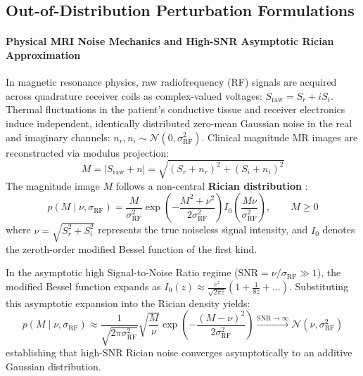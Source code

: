 \documentclass{article}
\begin{document}
\subsection{Out-of-Distribution Perturbation Formulations}

\paragraph{Physical MRI Noise Mechanics and High-SNR Asymptotic Rician Approximation}
In magnetic resonance physics, raw radiofrequency (RF) signals are acquired across quadrature receiver coils as complex-valued voltages: $S_{\text{raw}} = S_r + i S_i$. Thermal fluctuations in the patient's conductive tissue and receiver electronics induce independent, identically distributed zero-mean Gaussian noise in the real and imaginary channels: $n_r, n_i \sim \mathcal{N}(0, \sigma_{\text{RF}}^2)$. Clinical magnitude MR images are reconstructed via modulus projection:
\begin{equation}
    M = |S_{\text{raw}} + n| = \sqrt{(S_r + n_r)^2 + (S_i + n_i)^2}
\end{equation}
The magnitude image $M$ follows a non-central \textbf{Rician distribution} \citep{gudbjartsson1995rician}:
\begin{equation}
    p(M \mid \nu, \sigma_{\text{RF}}) = \frac{M}{\sigma_{\text{RF}}^2} \exp\left( - \frac{M^2 + \nu^2}{2\sigma_{\text{RF}}^2} \right) I_0\left( \frac{M \nu}{\sigma_{\text{RF}}^2} \right), \qquad M \ge 0
\end{equation}
where $\nu = \sqrt{S_r^2 + S_i^2}$ represents the true noiseless signal intensity, and $I_0$ denotes the zeroth-order modified Bessel function of the first kind.

In the asymptotic high Signal-to-Noise Ratio regime ($\text{SNR} = \nu / \sigma_{\text{RF}} \gg 1$), the modified Bessel function expands as $I_0(z) \approx \frac{e^z}{\sqrt{2\pi z}} \left( 1 + \frac{1}{8z} + \dots \right)$. Substituting this asymptotic expansion into the Rician density yields:
\begin{equation}
    p(M \mid \nu, \sigma_{\text{RF}}) \approx \frac{1}{\sqrt{2\pi \sigma_{\text{RF}}^2}} \sqrt{\frac{M}{\nu}} \exp\left( - \frac{(M - \nu)^2}{2\sigma_{\text{RF}}^2} \right) \xrightarrow{\text{SNR} \to \infty} \mathcal{N}(\nu, \sigma_{\text{RF}}^2)
\end{equation}
establishing that high-SNR Rician noise converges asymptotically to an additive Gaussian distribution.
\end{document}
